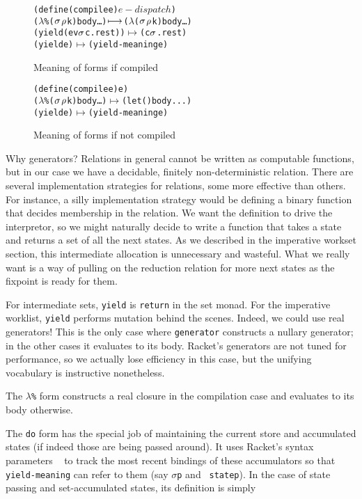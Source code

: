 \documentclass[preprint]{sigplanconf}
\begin{document}
\begin{figure}
\begin{alltt}
(define (compile e) \(e-dispatch\))
(\(\lambda\)\% (\(\msto\) \(\menv\) k) body \ldots) \(\machstep\) (\(\lambda\) (\(\msto\) \(\menv\) k) body \ldots)
(yield (ev \(\msto\) c . rest)) \(\longmapsto\) (c \(\msto\) . rest)
(yield e) \(\longmapsto\) (yield-meaning e)
\end{alltt}
\caption{Meaning of forms if compiled}
\label{fig:cfm}
\end{figure}

\begin{figure}
\begin{alltt}
(define (compile e) e)
(\(\lambda\)\% (\(\msto\) \(\menv\) k) body \ldots) \(\longmapsto\) (let () body ...)
(yield e) \(\longmapsto\) (yield-meaning e)
\end{alltt}
\caption{Meaning of forms if not compiled}
\label{fig:ncfm}
\end{figure}

Why generators? Relations in general cannot be written as computable
functions, but in our case we have a decidable, finitely
non-deterministic relation. There are several implementation
strategies for relations, some more effective than others. For
instance, a silly implementation strategy would be defining a binary
function that decides membership in the relation. We want the
definition to drive the interpretor, so we might naturally decide to
write a function that takes a state and returns a set of all the next
states. As we described in the imperative workset section, this
intermediate allocation is unnecessary and wasteful. What we really
want is a way of pulling on the reduction relation for more next
states as the fixpoint is ready for them.

For intermediate sets, {\tt yield} is {\tt return} in the set
monad. For the imperative worklist, {\tt yield} performs mutation
behind the scenes. Indeed, we could use real generators! This is the
only case where {\tt generator} constructs a nullary generator; in the
other cases it evaluates to its body. Racket's generators are not
tuned for performance, so we actually lose efficiency in this case,
but the unifying vocabulary is instructive nonetheless.

The {\tt $\lambda$\%} form constructs a real closure in the
compilation case and evaluates to its body otherwise.

The {\tt do} form has the special job of maintaining the current store
and accumulated states (if indeed those are being passed around). It
uses Racket's syntax parameters ~\cite{ianjohnson:eli/stxparam} to
track the most recent bindings of these accumulators so that {\tt
  yield-meaning} can refer to them (say {\tt $\sigma$p} and {\tt
  statep}). In the case of state passing and set-accumulated states, its
definition is simply
\end{document}
